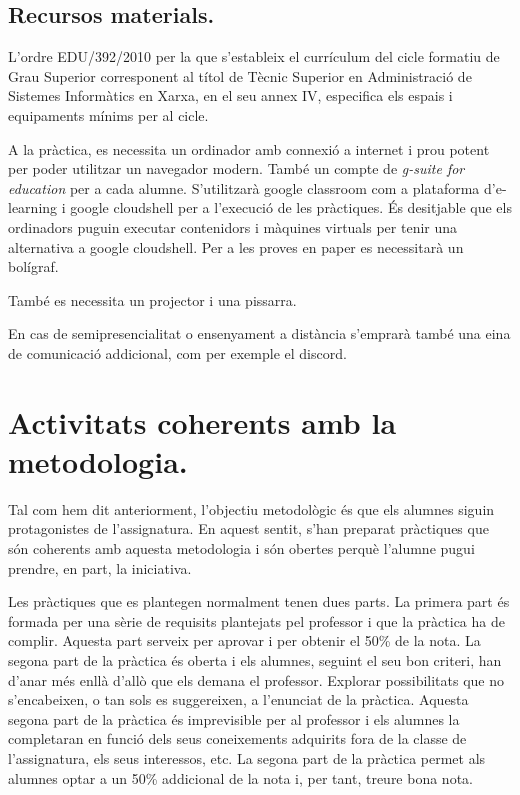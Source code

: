 \documentclass[catalan, a4paper, 12pt, titlepage]{article}
\begin{document}
\subsection{Recursos materials.}

L'ordre EDU/392/2010 per la que s'estableix el currículum del cicle formatiu de Grau Superior corresponent al títol de Tècnic Superior en Administració de Sistemes Informàtics en Xarxa, en el seu annex IV, especifica els espais i equipaments mínims per al cicle.

A la pràctica, es necessita un ordinador amb connexió a internet i prou potent per poder utilitzar un navegador modern. També un compte de \emph{g-suite for education} per a cada alumne. S'utilitzarà google classroom com a plataforma d'e-learning i google cloudshell per a l'execució de les pràctiques. És desitjable que els ordinadors puguin executar contenidors i màquines virtuals per tenir una alternativa a google cloudshell. Per a les proves en paper es necessitarà un bolígraf.

També es necessita un projector i una pissarra.

En cas de semipresencialitat o ensenyament a distància s'emprarà també una eina de comunicació addicional, com per exemple el discord.

\section{Activitats coherents amb la metodologia.}
\label{sec:activitats_coherents}

Tal com hem dit anteriorment, l'objectiu metodològic és que els alumnes siguin protagonistes de l'assignatura.
En aquest sentit, s'han preparat pràctiques que són coherents amb aquesta metodologia i són obertes perquè l'alumne pugui prendre, en part, la iniciativa.

Les pràctiques que es plantegen normalment tenen dues parts.
La primera part és formada per una sèrie de requisits plantejats pel professor i que la pràctica ha de complir. 
Aquesta part serveix per aprovar i per obtenir el 50\% de la nota.
La segona part de la pràctica és oberta i els alumnes, seguint el seu bon criteri, han d'anar més enllà d'allò que els demana el professor.
Explorar possibilitats que no s'encabeixen, o tan sols es suggereixen, a l'enunciat de la pràctica.
Aquesta segona part de la pràctica és imprevisible per al professor i els alumnes la completaran en funció dels seus coneixements adquirits fora de la classe de l'assignatura, els seus interessos, etc.
La segona part de la pràctica permet als alumnes optar a un 50\% addicional de la nota i, per tant, treure bona nota.
\end{document}
